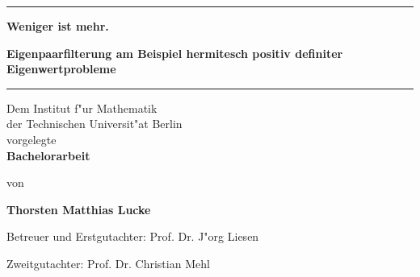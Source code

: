 \begin{titlepage}
  \begin{center}
    \vspace*{1cm}

\hrule \vspace{0.5cm}
    \Huge
    \textbf{\glqq Weniger ist mehr.\grqq}

    \vspace{0.5cm}
    \LARGE
    \textbf{Eigenpaarfilterung am Beispiel hermitesch positiv definiter Eigenwertprobleme}

\vspace{0.5cm} \hrule


    \vfill

    \small
    Dem Institut f"ur Mathematik\\
    der Technischen Universit"at Berlin\\
    vorgelegte\\

    \vspace{0.5cm}
    \LARGE
    \textbf{Bachelorarbeit}

    \vspace{1.5cm}

    \small
    von

    \vspace{0.5cm}
    \LARGE
    \textbf{Thorsten Matthias Lucke}

    \vfill

    \end{center}
    Betreuer und Erstgutachter: Prof. Dr. J"org Liesen

    Zweitgutachter: Prof. Dr. Christian Mehl

\end{titlepage}
